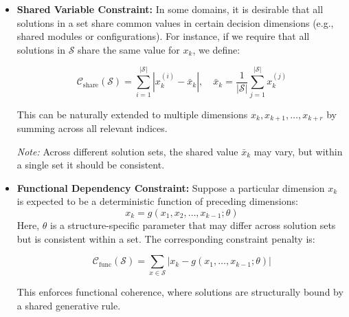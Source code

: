 \def\CTeXPreproc{Created by ctex v0.2.14, don't edit!}\documentclass[journal]{IEEEtran}
\begin{document}
\begin{itemize}
  \item \textbf{Shared Variable Constraint:}  
  In some domains, it is desirable that all solutions in a set share common values in certain decision dimensions (e.g., shared modules or configurations).  
  For instance, if we require that all solutions in $\mathcal{S}$ share the same value for $x_k$, we define:

  \[
  \mathcal{C}_{\text{share}}(\mathcal{S}) = \sum_{i=1}^{|\mathcal{S}|} \left| x_k^{(i)} - \bar{x}_k \right|, \quad \bar{x}_k = \frac{1}{|\mathcal{S}|} \sum_{j=1}^{|\mathcal{S}|} x_k^{(j)}
  \]

  This can be naturally extended to multiple dimensions $x_{k}, x_{k+1}, \dots, x_{k+r}$ by summing across all relevant indices.

  \textit{Note:} Across different solution sets, the shared value $\bar{x}_k$ may vary, but within a single set it should be consistent.

  \item \textbf{Functional Dependency Constraint:}  
  Suppose a particular dimension $x_k$ is expected to be a deterministic function of preceding dimensions:  
  \[
  x_k = g(x_1, x_2, \dots, x_{k-1}; \theta)
  \]
  Here, $\theta$ is a structure-specific parameter that may differ across solution sets but is consistent within a set. The corresponding constraint penalty is:

  \[
  \mathcal{C}_{\text{func}}(\mathcal{S}) = \sum_{x \in \mathcal{S}} \left| x_k - g(x_1, \dots, x_{k-1}; \theta) \right|
  \]

  This enforces functional coherence, where solutions are structurally bound by a shared generative rule.

\end{itemize}
\end{document}
